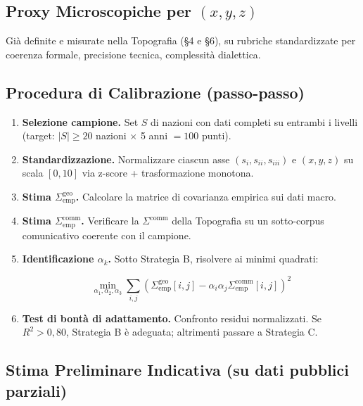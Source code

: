 \subsection{\texorpdfstring{Proxy Microscopiche per
\((x, y, z)\)}{Proxy Microscopiche per (x, y, z)}}\label{proxy-microscopiche-per-x-y-z}

Già definite e misurate nella Topografia (\S{}4 e \S{}6), su rubriche
standardizzate per coerenza formale, precisione tecnica, complessità
dialettica.

\subsection{Procedura di Calibrazione
(passo-passo)}\label{procedura-di-calibrazione-passo-passo}

\begin{enumerate}
\def\labelenumi{\arabic{enumi}.}
\item
  \textbf{Selezione campione.} Set \(S\) di nazioni con dati completi su
  entrambi i livelli (target: \(|S| \geq 20\) nazioni $\times$ 5 anni \(= 100\)
  punti).
\item
  \textbf{Standardizzazione.} Normalizzare ciascun asse
  \((s_i, s_{ii}, s_{iii})\) e \((x, y, z)\) su scala \([0, 10]\) via
  z-score + trasformazione monotona.
\item
  \textbf{Stima \(\Sigma^{\text{geo}}_{\text{emp}}\).} Calcolare la
  matrice di covarianza empirica sui dati macro.
\item
  \textbf{Stima \(\Sigma^{\text{comm}}_{\text{emp}}\).} Verificare la
  \(\Sigma^{\text{comm}}\) della Topografia su un sotto-corpus
  comunicativo coerente con il campione.
\item
  \textbf{Identificazione \(\alpha_k\).} Sotto Strategia B, risolvere ai
  minimi quadrati:

  \[\min_{\alpha_1, \alpha_2, \alpha_3} \sum_{i, j} \left( \Sigma^{\text{geo}}_{\text{emp}}[i,j] - \alpha_i \alpha_j \Sigma^{\text{comm}}_{\text{emp}}[i,j] \right)^2\]
\item
  \textbf{Test di bontà di adattamento.} Confronto residui normalizzati.
  Se \(R^2 > 0{,}80\), Strategia B è adeguata; altrimenti passare a
  Strategia C.
\end{enumerate}

\subsection{Stima Preliminare Indicativa (su dati pubblici
parziali)}\label{stima-preliminare-indicativa-su-dati-pubblici-parziali}

